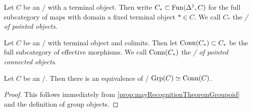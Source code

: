\begin{definition}
    Let $C$ be an \inftycat/ with a terminal object.
    Then write $C_*\subset\operatorname{Fun}(\Delta^1,C)$ for the full subcategory of maps with domain a fixed terminal object $*\in C$.
    We call $C_*$ the \emph{\inftycat/ of pointed objects}.
\end{definition}
\begin{definition}
    Let $C$ be an \inftycat/ with terminal object and colimits. 
    Then let $\operatorname{Conn}(C_*)\subset C_*$ be the full subcategory of effective morphisms.
    We call $\operatorname{Conn}(C_*)$ the \emph{\inftycat/ of pointed connected objects}.
\end{definition}
\begin{corollary}
    Let $C$ be an \inftytop/. 
    Then there is an equivalence of \inftycats/ $\operatorname{Grp}(C)\simeq\operatorname{Conn}(C)$.
    \begin{proof}
        This follows immediately from \cref{prop:mayRecognitionTheoremGroupoid} and the definition of group objects.
    \end{proof}
\end{corollary}
